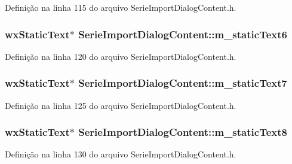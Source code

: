 Definição na linha 115 do arquivo Serie\+Import\+Dialog\+Content.\+h.

\subsubsection[{m\+\_\+static\+Text6}]{\setlength{\rightskip}{0pt plus 5cm}wx\+Static\+Text$\ast$ Serie\+Import\+Dialog\+Content\+::m\+\_\+static\+Text6\hspace{0.3cm}{\ttfamily [protected]}}\label{class_serie_import_dialog_content_aa40c60f643546499940f959ec4608fe8}


Definição na linha 120 do arquivo Serie\+Import\+Dialog\+Content.\+h.

\subsubsection[{m\+\_\+static\+Text7}]{\setlength{\rightskip}{0pt plus 5cm}wx\+Static\+Text$\ast$ Serie\+Import\+Dialog\+Content\+::m\+\_\+static\+Text7\hspace{0.3cm}{\ttfamily [protected]}}\label{class_serie_import_dialog_content_aeaaa8ca974736f228a95dfbcae909fff}


Definição na linha 125 do arquivo Serie\+Import\+Dialog\+Content.\+h.

\subsubsection[{m\+\_\+static\+Text8}]{\setlength{\rightskip}{0pt plus 5cm}wx\+Static\+Text$\ast$ Serie\+Import\+Dialog\+Content\+::m\+\_\+static\+Text8\hspace{0.3cm}{\ttfamily [protected]}}\label{class_serie_import_dialog_content_a19293a6ad0786a220c404b6bb3659ee7}


Definição na linha 130 do arquivo Serie\+Import\+Dialog\+Content.\+h.

